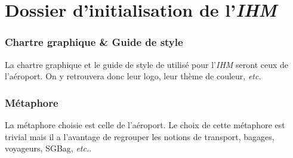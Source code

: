 \newpage
\part{Dossier d'initialisation de l'\textsl{IHM}}
\section{Chartre graphique \& Guide de style}
La chartre graphique et le guide de style de utilisé pour l'\textsl{IHM} seront ceux de l'aéroport. On y retrouvera donc leur logo, leur thème de couleur, \textsl{etc.}

\section{Métaphore}
La métaphore choisie est celle de \og l'aéroport\fg. Le choix de cette métaphore est trivial mais il a l'avantage de regrouper les notions de \og transport, bagages, voyageurs, SGBag, \textsl{etc.}\fg.
